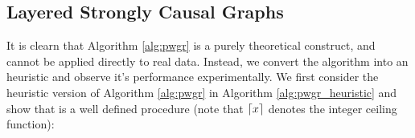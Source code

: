 \documentclass[12pt]{article}
\def\gcg{\mathcal{G}}  %
\def\B{\mathsf{B}}  %
\def\H{\mathcal{H}}  %
\begin{document}
\subsection{Layered Strongly Causal Graphs}
It is clearn that Algorithm \ref{alg:pwgr} is a purely theoretical construct, and cannot be applied directly to real data.  Instead, we convert the algorithm into an heuristic and observe it's performance experimentally.  We first consider the heuristic version of Algorithm \ref{alg:pwgr} in Algorithm \ref{alg:pwgr_heuristic} and show that is a well defined procedure (note that $\lceil x\rceil$ denotes the integer ceiling function):



\end{document}
